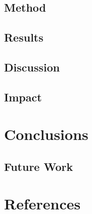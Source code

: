 \documentclass[12pt]{report}
\begin{document}
\section{Method}

\section{Results}

\section{Discussion}



\section{Impact}

\chapter{Conclusions}


\section{Future Work}



\chapter*{References}


\end{document}
